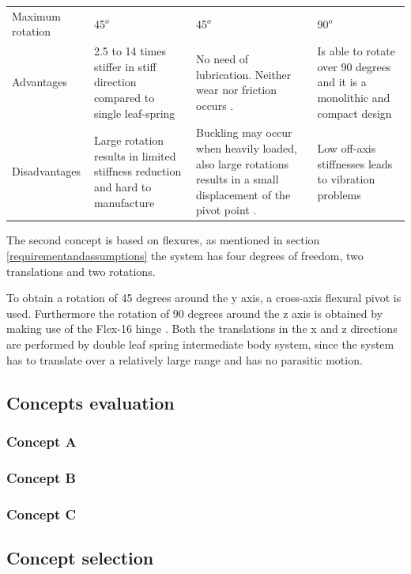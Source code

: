 \begin{table}[h]
\begin{tabular}{p{4cm}|p{4cm}p{4cm}p{4cm}}
\begin{minipage}{4cm}
    \end{minipage} \\ \hline
Maximum rotation      & 45$^o$ &  45$^o$ & 90$^o$  \\ \hline
Advantages           &  2.5 to 14 times stiffer in stiff 
direction compared to single leaf-spring & No need of lubrication. Neither
wear nor friction occurs \cite{Haringx1949TheElement}.  & Is able to rotate 
over 90 degrees and it is a monolithic and compact design\\ \hline
Disadvantages            &  Large rotation results in limited stiffness reduction and hard to manufacture & Buckling may occur when heavily loaded, also large rotations results in a small displacement of the pivot point \cite{Haringx1949TheElement}.  & Low off-axis  stiffnesses leads to vibration problems  \\ 
\end{tabular}
\end{table}

The second concept is based on flexures, as mentioned in section \ref{requirementandassumptions} the system has four degrees of freedom, two translations and two rotations. 

To obtain a rotation of 45 degrees around the y axis, a cross-axis flexural pivot is used. Furthermore the rotation of 90 degrees around the z axis is obtained by making use of the Flex-16 hinge \cite{Fowler2014Flex-16:Citation}. Both the translations in the x and z directions are performed by double leaf spring intermediate body system, since the system has to translate over a relatively large range and has no parasitic motion. 

\subsection{Concepts evaluation}

\subsubsection{Concept A}

\subsubsection{Concept B}

\subsubsection{Concept C}

\subsection{Concept selection}